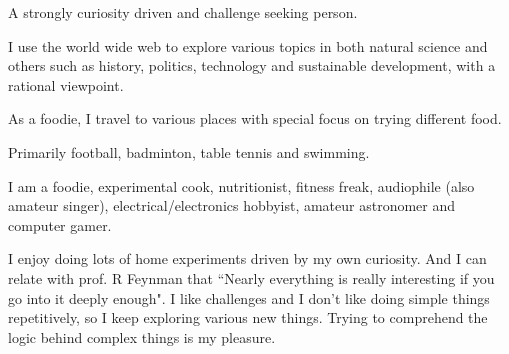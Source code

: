 {}


A strongly curiosity driven and challenge seeking person.

I use the world wide web to explore various topics in both natural science and others such as history, politics, technology and sustainable development, with a rational viewpoint.

As a foodie, I travel to various places with special focus on trying different food.

Primarily football, badminton, table tennis and swimming. 

I am a foodie, experimental cook, nutritionist, fitness freak, audiophile (also amateur singer), electrical/electronics hobbyist, amateur astronomer and computer gamer.

I enjoy doing lots of home experiments driven by my own curiosity. And I can relate with prof. R Feynman that ``Nearly everything is really interesting if you go into it deeply enough". 
I like challenges and I don't like doing simple things repetitively, so I keep exploring various new things. Trying to comprehend the logic behind complex things is my pleasure.






